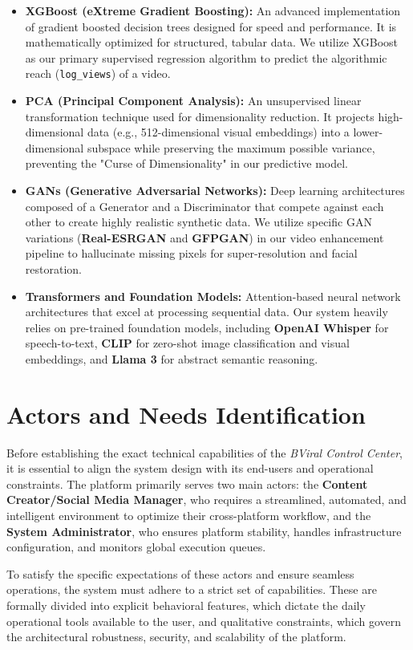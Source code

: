 \begin{itemize}
    \item \textbf{XGBoost (eXtreme Gradient Boosting):} An advanced implementation of gradient boosted decision trees designed for speed and performance. It is mathematically optimized for structured, tabular data. We utilize XGBoost as our primary supervised regression algorithm to predict the algorithmic reach (\texttt{log\_views}) of a video.
    \item \textbf{PCA (Principal Component Analysis):} An unsupervised linear transformation technique used for dimensionality reduction. It projects high-dimensional data (e.g., 512-dimensional visual embeddings) into a lower-dimensional subspace while preserving the maximum possible variance, preventing the "Curse of Dimensionality" in our predictive model.
    \item \textbf{GANs (Generative Adversarial Networks):} Deep learning architectures composed of a Generator and a Discriminator that compete against each other to create highly realistic synthetic data. We utilize specific GAN variations (\textbf{Real-ESRGAN} and \textbf{GFPGAN}) in our video enhancement pipeline to hallucinate missing pixels for super-resolution and facial restoration.
    \item \textbf{Transformers and Foundation Models:} Attention-based neural network architectures that excel at processing sequential data. Our system heavily relies on pre-trained foundation models, including \textbf{OpenAI Whisper} for speech-to-text, \textbf{CLIP} for zero-shot image classification and visual embeddings, and \textbf{Llama 3} for abstract semantic reasoning.
\end{itemize}

\section{Actors and Needs Identification}
Before establishing the exact technical capabilities of the \textit{BViral Control Center}, it is essential to align the system design with its end-users and operational constraints. The platform primarily serves two main actors: the \textbf{Content Creator/Social Media Manager}, who requires a streamlined, automated, and intelligent environment to optimize their cross-platform workflow, and the \textbf{System Administrator}, who ensures platform stability, handles infrastructure configuration, and monitors global execution queues. 

To satisfy the specific expectations of these actors and ensure seamless operations, the system must adhere to a strict set of capabilities. These are formally divided into explicit behavioral features, which dictate the daily operational tools available to the user, and qualitative constraints, which govern the architectural robustness, security, and scalability of the platform.
